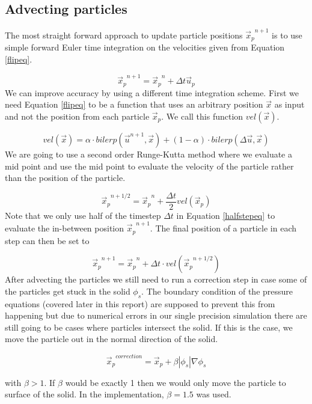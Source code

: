 \subsection{Advecting particles}

The most straight forward approach to update particle positions ${\vec{x}_p}^{n+1}$ is to use simple forward Euler time integration on the velocities given from Equation \ref{flipeq}. 

\begin{equation}
{\vec{x}_p}^{n+1} = {\vec{x}_p}^n + \Delta t \vec{u}_p 
\label{eulerstepeq}
\end{equation}
\noindent
We can improve accuracy by using a different time integration scheme. First we need Equation \ref{flipeq} to be a function that uses an arbitrary position $\vec{x}$ as input and not the position from each particle $\vec{x}_p$. We call this function $vel(\vec{x})$.

\begin{equation}
vel(\vec{x}) = \alpha \cdot bilerp(\vec{u}^{n+1}, \vec{x}) + (1-\alpha) \cdot bilerp(\Delta \vec{u},\vec{x})
\label{veleq}
\end{equation}
\noindent
We are going to use a second order Runge-Kutta method where we evaluate a mid point and use the mid point to evaluate the velocity of the particle rather than the position of the particle.

\begin{equation}
{\vec{x}_p}^{n + 1/2} = {\vec{x}_p}^n + \frac{\Delta t}{2} vel(\vec{x}_p)
\label{halfstepeq}
\end{equation}
\noindent
Note that we only use half of the timestep $\Delta t$ in Equation \ref{halfstepeq} to evaluate the in-between position ${\vec{x}_p}^{n+1}$. The final position of a particle in each step can then be set to

\begin{equation}
{\vec{x}_p}^{n + 1} = {\vec{x}_p}^n + \Delta t \cdot vel({\vec{x}_p}^{n+1/2})
\end{equation}
\noindent
After advecting the particles we still need to run a correction step in case some of the particles get stuck in the solid $\phi_s$. The boundary condition of the pressure equations (covered later in this report) are supposed to prevent this from happening but due to numerical errors in our single precision simulation there are still going to be cases where particles intersect the solid. If this is the case, we move the particle out in the normal direction of the solid.

\begin{equation}
{\vec{x}_p}^{correction} = \vec{x}_p + \beta |\phi_s|\nabla\phi_s
\end{equation}

with $\beta > 1$. If $\beta$ would be exactly 1 then we would only move the particle to surface of the solid. In the implementation, $\beta = 1.5$ was used.
